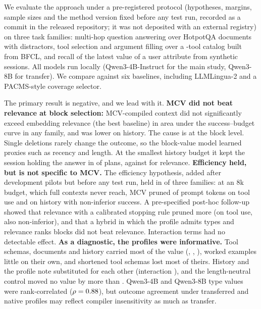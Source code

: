 We evaluate the approach under a pre-registered protocol (hypotheses, margins, sample sizes and the method version fixed
before any test run, recorded as a commit in the released repository; it was not deposited with an external registry) on three task families: multi-hop question answering over HotpotQA documents with distractors,
tool selection and argument filling over a \RNumTools-tool catalog built from BFCL, and recall of the latest value of a
user attribute from \RNumSessions synthetic sessions. All models run locally (Qwen3-4B-Instruct for the main study,
Qwen3-8B for transfer). We compare against six baselines, including LLMLingua-2 and a PACMS-style coverage selector.

The primary result is negative, and we lead with it. \textbf{MCV did not beat relevance at block selection:}
MCV-compiled context did not significantly exceed embedding relevance (the best baseline) in area under the
success--budget curve in any family, and was \RHOneHistoryAbs{} lower on history. The cause is at the block level. Single
deletions rarely change the outcome, so the block-value model learned proxies such as recency and length. At the smallest
history budget it kept the session holding the answer in \RRecallOurs of plans, against \RRecallRel for relevance.
\textbf{Efficiency held, but is not specific to MCV.} The efficiency hypothesis, added after development pilots but before
any test run, held in \RHOnebPass of three families: at an 8k budget, which full contexts never reach, MCV pruned
\RTokCutTool of prompt tokens on tool use and \RTokCutHistory on history with non-inferior success. A pre-specified
post-hoc follow-up showed that relevance with a calibrated stopping rule pruned more (\RTokCutStopTool on tool use, also
non-inferior), and that a hybrid in which the profile admits types and relevance ranks blocks did not beat relevance.
Interaction terms had no detectable effect. \textbf{As a diagnostic, the profiles were informative.} Tool schemas,
documents and history carried most of the value (\RMcvToolToolSchema, \RMcvFactsFact, \RMcvHistoryHistoryTurn),
worked examples little on their own, and shortened tool schemas lost most of theirs. History and the profile note
substituted for each other (interaction \RIntHistoryHistoryTurnNote), and the length-neutral control moved no value by
more than \RPadDiffMax. Qwen3-4B and Qwen3-8B type values were rank-correlated ($\rho=0.88$), but outcome agreement under
transferred and native profiles may reflect compiler insensitivity as much as transfer.

